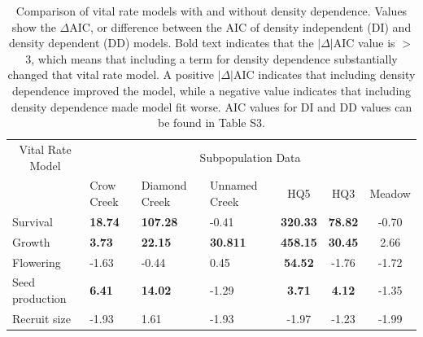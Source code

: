 \documentclass[12pt, letterpaper]{article}
\begin{document}
\begin{table}[h!]
\centering
\begin{spacing}{1.2}
\caption{ \internallinenumbers Comparison of vital rate models with and without density dependence. Values show the $\Delta$AIC, or difference between the AIC of density independent (DI) and density dependent (DD) models. Bold text indicates that the $|\Delta|$AIC value is $>$ 3, which means that including a term for density dependence substantially changed that vital rate model. A positive $|\Delta|$AIC indicates that including density dependence improved the model, while a negative value indicates that including density dependence made model fit worse. AIC values for DI and DD values can be found in Table S3. \label{Table:DDModResults}}
\begin{tabular}{l  p{} p{} p{}ccc}
\toprule
\multicolumn{1}{c}{Vital Rate Model} & \multicolumn{6}{c}{Subpopulation Data} 
\\ \cline{2-7}
 & Crow Creek & Diamond Creek & Unnamed Creek & HQ5 & HQ3 & Meadow \\ 
\hline
\rowcolor[gray]{.95} Survival &     \textbf{18.74} &   \textbf{107.28} &  -0.41 &   \textbf{320.33} &  \textbf{78.82} &   -0.70 \\ 
Growth &   \textbf{3.73} &    \textbf{22.15} &   \textbf{30.811} &  \textbf{458.15} &  \textbf{30.45} &  2.66 \\
\rowcolor[gray]{.95} Flowering &      -1.63 &   -0.44 &   0.45 &    \textbf{54.52} &   -1.76 &  -1.72 \\
Seed production &                          \textbf{6.41} &    \textbf{14.02} &   -1.29 &   \textbf{3.71} &    \textbf{4.12} &   -1.35 \\ 
\rowcolor[gray]{.95} Recruit size &      -1.93 &   1.61 &   -1.93 &   -1.97 &   -1.23 &  -1.99 \\
\hline
\end{tabular}
\end{spacing}
\end{table}
\end{document}
